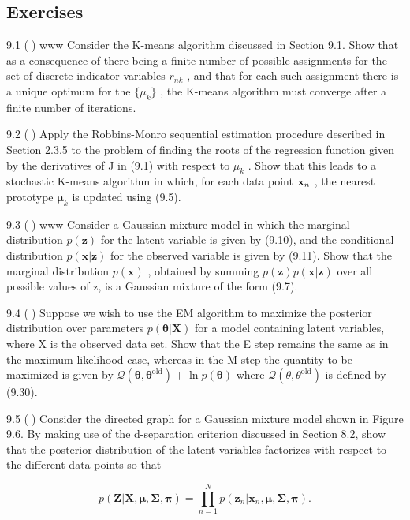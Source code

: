 \documentclass[
  10
]{article}
\begin{document}
\subsection{Exercises}\label{exercises-1}

9.1 () www Consider the K-means algorithm discussed in Section 9.1. Show
that as a consequence of there being a finite number of possible
assignments for the set of discrete indicator variables \(r _ { n k }\)
, and that for each such assignment there is a unique optimum for the
\(\{ \mu _ { k } \}\) , the K-means algorithm must converge after a
finite number of iterations.

9.2 () Apply the Robbins-Monro sequential estimation procedure described
in Section 2.3.5 to the problem of finding the roots of the regression
function given by the derivatives of J in (9.1) with respect to
\(\mu _ { k }\) . Show that this leads to a stochastic K-means algorithm
in which, for each data point \({ \bf x } _ { n }\) , the nearest
prototype \(\pmb { \mu } _ { k }\) is updated using (9.5).

9.3 () www Consider a Gaussian mixture model in which the marginal
distribution \(p ( \mathbf { z } )\) for the latent variable is given by
(9.10), and the conditional distribution
\(p ( \mathbf { x } | \mathbf { z } )\) for the observed variable is
given by (9.11). Show that the marginal distribution
\(p ( \mathbf { x } )\) , obtained by summing
\(p ( \mathbf { z } ) p ( \mathbf { x } | \mathbf { z } )\) over all
possible values of z, is a Gaussian mixture of the form (9.7).

9.4 () Suppose we wish to use the EM algorithm to maximize the posterior
distribution over parameters \(p ( \pmb \theta | \mathbf X )\) for a
model containing latent variables, where X is the observed data set.
Show that the E step remains the same as in the maximum likelihood case,
whereas in the M step the quantity to be maximized is given by
\(\mathcal { Q } ( \pmb { \theta } , \pmb { \theta } ^ { \mathrm { o l d } } ) + \ln p ( \pmb { \theta } )\)
where \(\mathcal { Q } ( \theta , \theta ^ { \mathrm { o l d } } )\) is
defined by (9.30).

9.5 () Consider the directed graph for a Gaussian mixture model shown in
Figure 9.6. By making use of the d-separation criterion discussed in
Section 8.2, show that the posterior distribution of the latent
variables factorizes with respect to the different data points so that

\[
p (\mathbf {Z} | \mathbf {X}, \boldsymbol {\mu}, \boldsymbol {\Sigma}, \boldsymbol {\pi}) = \prod_ {n = 1} ^ {N} p (\mathbf {z} _ {n} | \mathbf {x} _ {n}, \boldsymbol {\mu}, \boldsymbol {\Sigma}, \boldsymbol {\pi}).\tag{9.80}
\]
\end{document}
